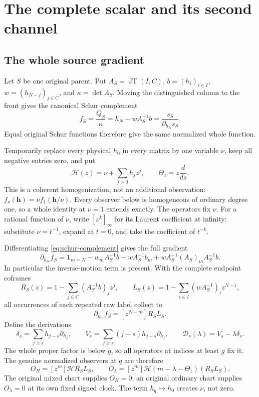 \documentclass[11pt,a4paper]{amsart}
\numberwithin{equation}{section}
\theoremstyle{plain}
\theoremstyle{definition}
\newcommand{\one}{\mathbf1}
\newcommand{\JT}{\operatorname{JT}}
\newcommand{\DD}{\mathscr D}
\begin{document}
\section{The complete scalar and its second channel}\label{sec:response}

\subsection{The whole source gradient}
Let \(S\) be one original parent.  Put \(A_S=\JT(I,C)\), \(b=(h_i)_{i\in I}\), \(w=(h_{N-j})_{j\in C}\), and \(\kappa=\det A_S\).  Moving the distinguished column to the front gives the canonical Schur complement
\begin{equation}\label{eq:schur-complement}
 f_S=\frac{Q_S}{\kappa}=h_N-wA_S^{-1}b
       =\frac{s_S}{\partial_{h_N}s_S}.
\end{equation}
Equal original Schur functions therefore give the same normalized whole function.

Temporarily replace every physical \(h_0\) in every matrix by one variable \(\nu\), keep all negative entries zero, and put
\[
 \mathcal H(z)=\nu+\sum_{j>0}h_jz^j,\qquad \Theta_z=z\frac{d}{dz}.
\]
This is a coherent homogenization, not an additional observation: \(f_\nu(\boldsymbol h)=\nu f_1(\boldsymbol h/\nu)\).  Every observer below is homogeneous of ordinary degree one, so a whole identity at \(\nu=1\) extends exactly.  The operators fix \(\nu\).
For a rational function of \(\nu\), write \([\nu^k]_\infty\) for
its Laurent coefficient at infinity: substitute \(\nu=t^{-1}\),
expand at \(t=0\), and take the coefficient of \(t^{-k}\).

Differentiating \eqref{eq:schur-complement} gives the full gradient
\[
 \partial_{h_m}f_S=\one_{m=N}-w_mA_S^{-1}b
 -wA_S^{-1}b_m+wA_S^{-1}(A_S)_mA_S^{-1}b.
\]
In particular the inverse-motion term is present.  With the complete endpoint coframes
\[
 R_S(z)=1-\sum_{j\in C}(A_S^{-1}b)_jz^j,\qquad
 L_S(z)=1-\sum_{i\in I}(wA_S^{-1})_iz^{N-i},
\]
all occurrences of each repeated raw label collect to
\begin{equation}\label{eq:gradient-product}
 \partial_{h_m}f_S=[z^{N-m}]R_SL_S.
\end{equation}
Define the derivations
\[
 \delta_s=\sum_{j\ge s}h_{j-s}\partial_{h_j},\qquad
 V_s=\sum_{j\ge s}(j-s)h_{j-s}\partial_{h_j},\qquad
 \DD_s(\lambda)=V_s-\lambda\delta_s.
\]
The whole proper factor is below \(g\), so all operators at indices at least \(g\) fix it.  The genuine normalized observers at \(q\) are therefore
\begin{equation}\label{eq:whole-observers}
 O_H=[z^{m}]\mathcal HR_SL_S,\qquad
 O_\lambda=[z^{m}]\mathcal H(m-\lambda-\Theta_z)(R_SL_S).
\end{equation}
The original mixed chart supplies \(O_H=0\); an original ordinary chart supplies \(O_\lambda=0\) at its own fixed signed clock.  The term \(h_q\mapsto h_0\) creates \(\nu\), not zero.
\end{document}

